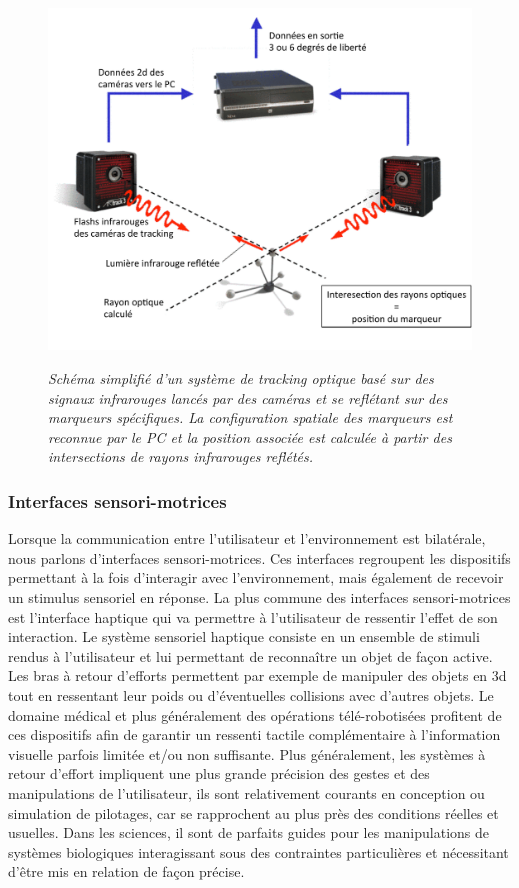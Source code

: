 \begin{figure}
  \centering
  {\includegraphics[width=.65\linewidth]{./figures/ch2/IR-tracking}}
    \caption{{\it Schéma simplifié d'un système de tracking optique basé sur des signaux infrarouges lancés par des caméras et se reflétant sur des marqueurs spécifiques. La configuration spatiale des marqueurs est reconnue par le PC et la position associée est calculée à partir des intersections de rayons infrarouges reflétés.}}
  \label{Fig:ir-tracking}
  \hspace{0.3cm}
\end{figure}

\subsubsection{Interfaces sensori-motrices} \label{interface_sensor-motor}

Lorsque la communication entre l'utilisateur et l'environnement est bilatérale, nous parlons d'interfaces sensori-motrices. Ces interfaces regroupent les dispositifs permettant à la fois d'interagir avec l'environnement, mais également de recevoir un stimulus sensoriel en réponse. La plus commune des interfaces sensori-motrices est l'interface haptique qui va permettre à l'utilisateur de ressentir l'effet de son interaction. Le système sensoriel haptique consiste en un ensemble de stimuli rendus à l'utilisateur et lui permettant de reconnaître un objet de façon active. Les bras à retour d'efforts permettent par exemple de manipuler des objets en 3d tout en ressentant leur poids ou d'éventuelles collisions avec d'autres objets. Le domaine médical et plus généralement des opérations télé-robotisées profitent de ces dispositifs afin de garantir un ressenti tactile complémentaire à l'information visuelle parfois limitée et/ou non suffisante. Plus généralement, les systèmes à retour d'effort impliquent une plus grande précision des gestes et des manipulations de l'utilisateur, ils sont relativement courants en conception ou simulation de pilotages, car se rapprochent au plus près des conditions réelles et usuelles.
Dans les sciences, il sont de parfaits guides pour les manipulations de systèmes biologiques interagissant sous des contraintes particulières et nécessitant d'être mis en relation de façon précise.

